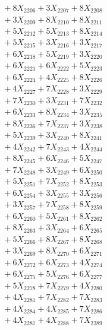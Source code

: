 \documentclass[a4paper,10pt]{article}
\begin{document}
{\begin{align}
&\;  + 8 X_{2206} + 3 X_{2207} + 8 X_{2208} \\[0.3ex]
&\;  + 3 X_{2209} + 8 X_{2210} + 8 X_{2211} \\[0.3ex]
&\;  + 5 X_{2212} + 5 X_{2213} + 8 X_{2214} \\[0.3ex]
&\;  + 5 X_{2215} + 3 X_{2216} + 3 X_{2217} \\[0.3ex]
&\;  + 6 X_{2218} + 5 X_{2219} + 3 X_{2220} \\[0.3ex]
&\;  + 6 X_{2221} + 6 X_{2222} + 5 X_{2223} \\[0.3ex]
&\;  + 6 X_{2224} + 4 X_{2225} + 8 X_{2226} \\[0.3ex]
&\;  + 4 X_{2227} + 7 X_{2228} + 3 X_{2229} \\[0.5ex]\allowbreak
&\;  + 7 X_{2230} + 3 X_{2231} + 7 X_{2232} \\[0.3ex]
&\;  + 6 X_{2233} + 8 X_{2234} + 3 X_{2235} \\[0.3ex]
&\;  + 8 X_{2236} + 7 X_{2237} + 3 X_{2238} \\[0.3ex]
&\;  + 5 X_{2239} + 3 X_{2240} + 8 X_{2241} \\[0.3ex]
&\;  + 4 X_{2242} + 7 X_{2243} + 4 X_{2244} \\[0.3ex]
&\;  + 8 X_{2245} + 6 X_{2246} + 5 X_{2247} \\[0.3ex]
&\;  + 7 X_{2248} + 3 X_{2249} + 6 X_{2250} \\[0.3ex]
&\;  + 5 X_{2251} + 7 X_{2252} + 8 X_{2253} \\[0.3ex]
&\;  + 6 X_{2254} + 3 X_{2255} + 3 X_{2256} \\[0.3ex]
&\;  + 3 X_{2257} + 7 X_{2258} + 8 X_{2259} \\[0.5ex]\allowbreak
&\;  + 6 X_{2260} + 5 X_{2261} + 8 X_{2262} \\[0.3ex]
&\;  + 8 X_{2263} + 3 X_{2264} + 6 X_{2265} \\[0.3ex]
&\;  + 5 X_{2266} + 8 X_{2267} + 8 X_{2268} \\[0.3ex]
&\;  + 3 X_{2269} + 8 X_{2270} + 6 X_{2271} \\[0.3ex]
&\;  + 6 X_{2272} + 6 X_{2273} + 4 X_{2274} \\[0.3ex]
&\;  + 6 X_{2275} + 5 X_{2276} + 6 X_{2277} \\[0.3ex]
&\;  + 5 X_{2278} + 7 X_{2279} + 4 X_{2280} \\[0.3ex]
&\;  + 4 X_{2281} + 7 X_{2282} + 7 X_{2283} \\[0.3ex]
&\;  + 4 X_{2284} + 4 X_{2285} + 7 X_{2286} \\[0.3ex]
&\;  + 4 X_{2287} + 4 X_{2288} + 7 X_{2289} \\[0.5ex]\allowbreak

\end{align}}
\end{document}
